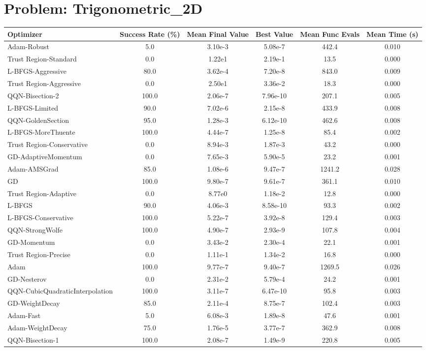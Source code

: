 \documentclass{article}
\begin{document}
\section{Problem: Trigonometric\_2D}
\begin{longtable}{p{3cm}*{5}{c}}
\toprule
\textbf{Optimizer} & \textbf{Success Rate (\%)} & \textbf{Mean Final Value} & \textbf{Best Value} & \textbf{Mean Func Evals} & \textbf{Mean Time (s)} \\
\midrule
Adam-Robust & 5.0 & 3.10e-3 & 5.08e-7 & 442.4 & 0.010 \\
Trust Region-Standard & 0.0 & 1.22e1 & 2.19e-1 & 13.5 & 0.000 \\
L-BFGS-Aggressive & 80.0 & 3.62e-4 & 7.20e-8 & 843.0 & 0.009 \\
Trust Region-Aggressive & 0.0 & 2.50e1 & 3.36e-2 & 18.3 & 0.000 \\
QQN-Bisection-2 & 100.0 & 2.06e-7 & 7.96e-10 & 207.1 & 0.005 \\
L-BFGS-Limited & 90.0 & 7.02e-6 & 2.15e-8 & 433.9 & 0.008 \\
QQN-GoldenSection & 95.0 & 1.28e-3 & 6.12e-10 & 462.6 & 0.008 \\
L-BFGS-MoreThuente & 100.0 & 4.44e-7 & 1.25e-8 & 85.4 & 0.002 \\
Trust Region-Conservative & 0.0 & 8.94e-3 & 1.87e-3 & 43.2 & 0.000 \\
GD-AdaptiveMomentum & 0.0 & 7.65e-3 & 5.90e-5 & 23.2 & 0.001 \\
Adam-AMSGrad & 85.0 & 1.08e-6 & 9.47e-7 & 1241.2 & 0.028 \\
GD & 100.0 & 9.80e-7 & 9.61e-7 & 361.1 & 0.010 \\
Trust Region-Adaptive & 0.0 & 8.77e0 & 1.18e-2 & 12.8 & 0.000 \\
L-BFGS & 90.0 & 4.06e-3 & 8.58e-10 & 93.3 & 0.002 \\
L-BFGS-Conservative & 100.0 & 5.22e-7 & 3.92e-8 & 129.4 & 0.003 \\
QQN-StrongWolfe & 100.0 & 4.90e-7 & 2.93e-9 & 107.8 & 0.004 \\
GD-Momentum & 0.0 & 3.43e-2 & 2.30e-4 & 22.1 & 0.001 \\
Trust Region-Precise & 0.0 & 1.11e-1 & 1.34e-2 & 16.8 & 0.000 \\
Adam & 100.0 & 9.77e-7 & 9.40e-7 & 1269.5 & 0.026 \\
GD-Nesterov & 0.0 & 2.31e-2 & 5.79e-4 & 24.2 & 0.001 \\
QQN-CubicQuadraticInterpolation & 100.0 & 3.11e-7 & 6.47e-10 & 95.8 & 0.003 \\
GD-WeightDecay & 85.0 & 2.11e-4 & 8.75e-7 & 102.4 & 0.003 \\
Adam-Fast & 5.0 & 6.08e-3 & 1.89e-8 & 47.6 & 0.001 \\
Adam-WeightDecay & 75.0 & 1.76e-5 & 3.77e-7 & 362.9 & 0.008 \\
QQN-Bisection-1 & 100.0 & 2.08e-7 & 1.49e-9 & 220.8 & 0.005 \\
\bottomrule
\end{longtable}
\end{document}
